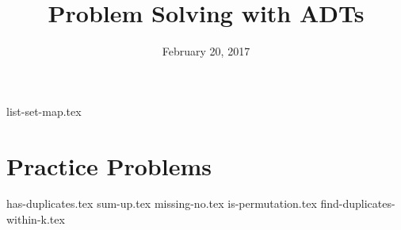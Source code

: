 \documentclass{exam}
\title{Problem Solving with ADTs}
\date{February 20, 2017}
\begin{document}
\maketitle

{list-set-map.tex}

\clearpage

\section{Practice Problems}
\begin{questions}
{has-duplicates.tex}
{sum-up.tex}
\clearpage
{missing-no.tex}
{is-permutation.tex}
\clearpage
{find-duplicates-within-k.tex}
\end{questions}
\end{document}
